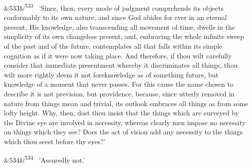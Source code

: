 \documentclass[12pt]{article}
\newcommand{\para}[1][]{\par\noindent\ifx&#1&\else\textsuperscript{\footnotesize #1}~\fi}
\begin{document}
\para[533] 'Since, then, every mode of judgment comprehends its objects conformably to its own nature, and since God abides for ever in an eternal present, His knowledge, also transcending all movement of time, dwells in the simplicity of its own changeless present, and, embracing the whole infinite sweep of the past and of the future, contemplates all that falls within its simple cognition as if it were now taking place. And therefore, if thou wilt carefully consider that immediate presentment whereby it discriminates all things, thou wilt more rightly deem it not foreknowledge as of something future, but knowledge of a moment that never passes. For this cause the name chosen to describe it is not prevision, but providence, because, since utterly removed in nature from things mean and trivial, its outlook embraces all things as from some lofty height. Why, then, dost thou insist that the things which are surveyed by the Divine eye are involved in necessity, whereas clearly men impose no necessity on things which they see? Does the act of vision add any necessity to the things which thou seest before thy eyes?'

\para[534] 'Assuredly not.'
\end{document}
